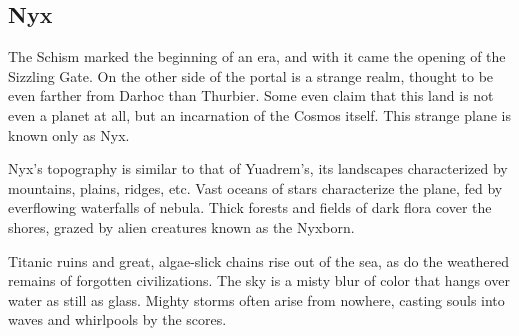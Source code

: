 
\vspace{12.0cm}

\subsection*{Nyx}
The Schism marked the beginning of an era, and with it came the opening of the Sizzling Gate.
On the other side of the portal is a strange realm, thought to be even farther from Darhoc than Thurbier.
Some even claim that this land is not even a planet at all, but an incarnation of the Cosmos itself.
This strange plane is known only as Nyx.

Nyx's topography is similar to that of Yuadrem's, its landscapes characterized by mountains, plains, ridges, etc.
Vast oceans of stars characterize the plane, fed by everflowing waterfalls of nebula.
Thick forests and fields of dark flora cover the shores, grazed by alien creatures known as the Nyxborn.

Titanic ruins and great, algae-slick chains rise out of the sea, as do the weathered remains of forgotten civilizations.
The sky is a misty blur of color that hangs over water as still as glass.
Mighty storms often arise from nowhere, casting souls into waves and whirlpools by the scores.

